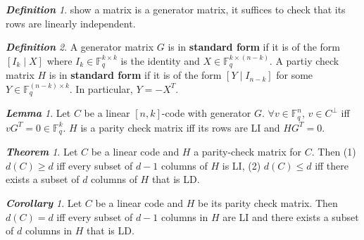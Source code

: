 \documentclass[frenchspacing,9pt,landscape,a4paper]{article}
\newcommand{\BF}{\mathbb F}
\newcommand{\tb}[1]{\textbf {#1}}
\theoremstyle{remark}
\newtheorem*{thm}{\textbf{Theorem}}
\newtheorem*{defn}{\textbf{Definition}}
\newtheorem*{lem}{\textbf{Lemma}}
\newtheorem*{cor}{\tb{Corollary}}
\begin{document}
\begin{multicols}{4}
\begin{defn}
    show a matrix is a generator matrix, it suffices to check that its rows are linearly independent.
\end{defn}
\begin{defn}
    A generator matrix $G$ is in \tb{standard form} if it is of the form  $[I_k\mid X]$ where
    $I_k\in\BF_q^{k\times k}$ is the identity and  $X\in\BF_q^{k\times(n-k)}$. A partiy check matrix  $H$
    is in \tb{standard form} if it is of the form  $[Y\mid I_{n-k}]$ for some  $Y\in\BF_q^{(n-k)\times k}$.
    In particular, $Y=-X^T$.
\end{defn}
\begin{lem}
    Let  $C$ be a linear  $[n,k]$-code with generator $G$.  $\forall v\in\BF_q^n$,  $v\in C^\perp$ iff
    $vG^T=0\in\BF_q^k$.  $H$ is a parity check matrix iff its rows are LI and  $HG^T=0$.
\end{lem}
\begin{thm}
    Let $C$ be a linear code and  $H$ a parity-check matrix for  $C$. Then (1) $d(C)\geq d$ iff every
    subset of  $d-1$ columns of  $H$ is LI, (2)  $d(C)\leq d$ iff there exists a subset of  $d$ columns of
     $H$ that is LD.
\end{thm}
\begin{cor}
    Let $C$ be a linear code and  $H$ be its parity check matrix. Then  $d(C)=d$ iff every subset of  $d-1$
    columns in $H$ are LI and there exists a subset of $d$ columns in $H$ that is LD.
\end{cor}

\end{multicols}
\end{document}
